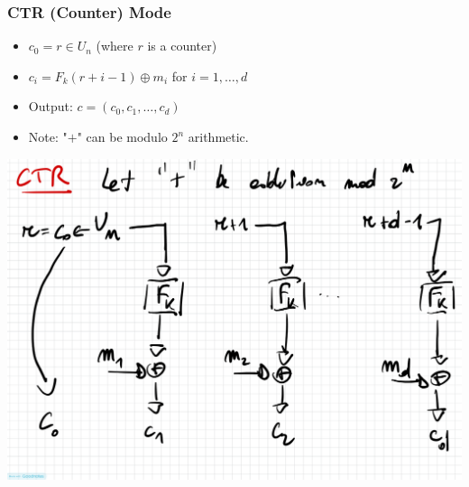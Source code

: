 \documentclass[11pt, a4paper]{article}
\begin{document}
\subsubsection*{CTR (Counter) Mode} 
\begin{itemize}
    \item $c_0 = r \in U_n$ (where $r$ is a counter) 
    \item $c_i = F_k(r+i-1) \oplus m_i$ for $i=1, \dots, d$ 
    \item Output: $c = (c_0, c_1, \dots, c_d)$
    \item Note: "$+$" can be modulo $2^n$ arithmetic. 
\end{itemize}
\begin{center}
    \includegraphics[scale=0.4]{img/Symmetric/CTR.png}
\end{center}
\end{document}
